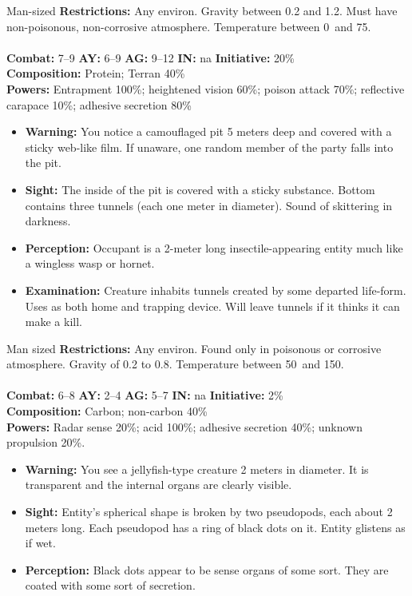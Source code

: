 \hrulefill

\begin{creature}{Man-sized}
\textbf{Restrictions:} Any environ. Gravity between 0.2 and 1.2. Must have non-poisonous, non-corrosive atmosphere. 
Temperature between 0\textdegree\ and 75\textdegree. \\\\
\textbf{Combat:} 7--9 \textbf{AY:} 6--9 \textbf{AG:} 9--12 \textbf{IN:} na \textbf{Initiative:} 20\% \\
\textbf{Composition:} Protein; Terran 40\% \\
\textbf{Powers:} Entrapment 100\%; heightened vision 60\%; poison attack 70\%; reflective carapace 10\%; adhesive secretion 80\% 
\begin{itemize}
\item \textbf{Warning:} You notice a camouflaged pit 5 meters deep and covered with a sticky web-like film. If unaware, one random member of 
the party falls into the pit. 
\item \textbf{Sight:} The inside of the pit is covered with a sticky substance. Bottom contains three tunnels (each one meter in diameter). Sound of 
skittering in darkness. 
\item \textbf{Perception:} Occupant is a 2-meter long insectile-appearing entity much like a wingless wasp or hornet. 
\item \textbf{Examination:} Creature inhabits tunnels created by some departed life-form. Uses as both home and trapping device. Will leave 
tunnels if it thinks it can make a kill. 
\end{itemize}
\end{creature}

\hrulefill

\begin{creature}{Man sized}
\textbf{Restrictions:} Any environ. Found only in poisonous or corrosive atmosphere. Gravity of 0.2 to 0.8. Temperature between 50\textdegree\ and 
150\textdegree. \\\\
\textbf{Combat:} 6--8 \textbf{AY:} 2--4 \textbf{AG:} 5--7 \textbf{IN:} na \textbf{Initiative:} 2\% \\
\textbf{Composition:} Carbon; non-carbon 40\% \\
\textbf{Powers:} Radar sense 20\%; acid 100\%; adhesive secretion 40\%; unknown propulsion 20\%. 
\begin{itemize}
\item \textbf{Warning:} You see a jellyfish-type creature 2 meters in diameter. It is transparent and the internal organs are clearly visible. 
\item \textbf{Sight:} Entity's spherical shape is broken by two pseudopods, each about 2 meters long. Each pseudopod has a ring of black dots on 
it. Entity glistens as if wet. 
\item \textbf{Perception:} Black dots appear to be sense organs of some sort. They are coated with some sort of secretion. 
\end{itemize}
\end{creature}

